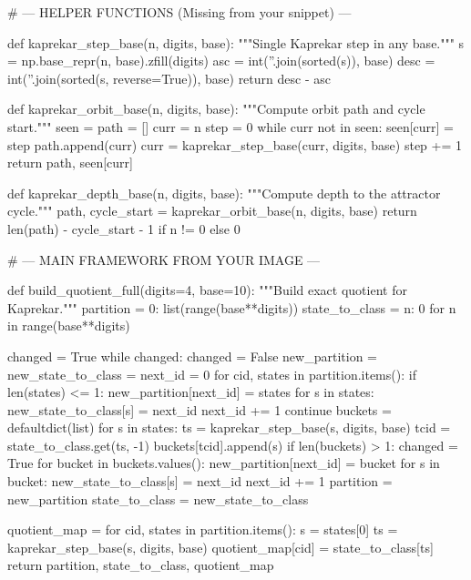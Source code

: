 # --- HELPER FUNCTIONS (Missing from your snippet) ---

def kaprekar_step_base(n, digits, base):
    """Single Kaprekar step in any base."""
    s = np.base_repr(n, base).zfill(digits)
    asc = int(''.join(sorted(s)), base)
    desc = int(''.join(sorted(s, reverse=True)), base)
    return desc - asc

def kaprekar_orbit_base(n, digits, base):
    """Compute orbit path and cycle start."""
    seen = {}
    path = []
    curr = n
    step = 0
    while curr not in seen:
        seen[curr] = step
        path.append(curr)
        curr = kaprekar_step_base(curr, digits, base)
        step += 1
    return path, seen[curr]

def kaprekar_depth_base(n, digits, base):
    """Compute depth to the attractor cycle."""
    path, cycle_start = kaprekar_orbit_base(n, digits, base)
    return len(path) - cycle_start - 1 if n != 0 else 0

# --- MAIN FRAMEWORK FROM YOUR IMAGE ---

def build_quotient_full(digits=4, base=10):
    """Build exact quotient for Kaprekar."""
    partition = {0: list(range(base**digits))}
    state_to_class = {n: 0 for n in range(base**digits)}
    
    changed = True
    while changed:
        changed = False
        new_partition = {}
        new_state_to_class = {}
        next_id = 0
        for cid, states in partition.items():
            if len(states) <= 1:
                new_partition[next_id] = states
                for s in states:
                    new_state_to_class[s] = next_id
                next_id += 1
                continue
            buckets = defaultdict(list)
            for s in states:
                ts = kaprekar_step_base(s, digits, base)
                tcid = state_to_class.get(ts, -1)
                buckets[tcid].append(s)
            if len(buckets) > 1:
                changed = True
            for bucket in buckets.values():
                new_partition[next_id] = bucket
                for s in bucket:
                    new_state_to_class[s] = next_id
                next_id += 1
        partition = new_partition
        state_to_class = new_state_to_class
    
    quotient_map = {}
    for cid, states in partition.items():
        s = states[0]
        ts = kaprekar_step_base(s, digits, base)
        quotient_map[cid] = state_to_class[ts]
    return partition, state_to_class, quotient_map

